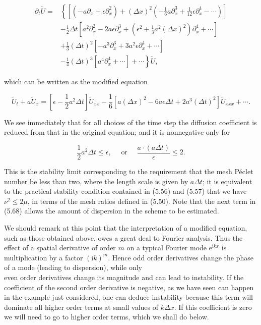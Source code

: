 \documentclass[10pt]{article}
\begin{document}
\[
\begin{aligned}
\partial_{t} \tilde{U}= & \left\{\left[\left(-a \partial_{x}+\epsilon \partial_{x}^{2}\right)+(\Delta x)^{2}\left(-\frac{1}{6} a \partial_{x}^{3}+\frac{1}{12} \epsilon \partial_{x}^{4}-\cdots\right)\right]\right. \\
& -\frac{1}{2} \Delta t\left[a^{2} \partial_{x}^{2}-2 a \epsilon \partial_{x}^{3}+\left(\epsilon^{2}+\frac{1}{3} a^{2}(\Delta x)^{2}\right) \partial_{x}^{4}+\cdots\right] \\
& +\frac{1}{3}(\Delta t)^{2}\left[-a^{3} \partial_{x}^{3}+3 a^{2} \epsilon \partial_{x}^{4}+\cdots\right] \\
& \left.-\frac{1}{4}(\Delta t)^{3}\left[a^{4} \partial_{x}^{4}+\cdots\right]+\cdots\right\} \tilde{U},
\end{aligned}
\]

which can be written as the modified equation

\[
\tilde{U}_{t}+a \tilde{U}_{x}=\left[\epsilon-\frac{1}{2} a^{2} \Delta t\right] \tilde{U}_{x x}-\frac{1}{6}\left[a(\Delta x)^{2}-6 a \epsilon \Delta t+2 a^{3}(\Delta t)^{2}\right] \tilde{U}_{x x x}+\cdots .
\]

We see immediately that for all choices of the time step the diffusion coefficient is reduced from that in the original equation; and it is nonnegative only for

\[
\frac{1}{2} a^{2} \Delta t \leq \epsilon, \quad \text { or } \quad \frac{a \cdot(a \Delta t)}{\epsilon} \leq 2 .
\]

This is the stability limit corresponding to the requirement that the mesh Péclet number be less than two, where the length scale is given by \(a \Delta t\); it is equivalent to the practical stability condition contained in (5.56) and (5.57) that we have \(\nu^{2} \leq 2 \mu\), in terms of the mesh ratios defined in (5.50). Note that the next term in (5.68) allows the amount of dispersion in the scheme to be estimated.

We should remark at this point that the interpretation of a modified equation, such as those obtained above, owes a great deal to Fourier analysis. Thus the effect of a spatial derivative of order \(m\) on a typical Fourier mode \(\mathrm{e}^{\mathrm{i} k x}\) is multiplication by a factor \((\mathrm{i} k)^{m}\). Hence odd order derivatives change the phase of a mode (leading to dispersion), while only\\
even order derivatives change its magnitude and can lead to instability. If the coefficient of the second order derivative is negative, as we have seen can happen in the example just considered, one can deduce instability because this term will dominate all higher order terms at small values of \(k \Delta x\). If this coefficient is zero we will need to go to higher order terms, which we shall do below.
\end{document}
